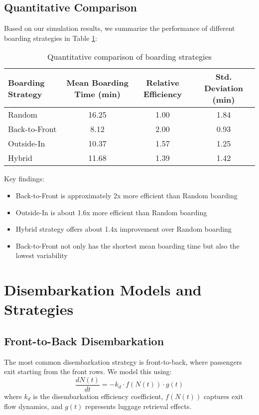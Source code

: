 \documentclass[12pt,a4paper]{article}
\begin{document}
\subsection{Quantitative Comparison}
Based on our simulation results, we summarize the performance of different boarding strategies in Table \ref{tab:boarding_comparison}:

\begin{table}[H]
\centering
\begin{tabular}{|l|c|c|c|}
\hline
\textbf{Boarding Strategy} & \textbf{Mean Boarding Time (min)} & \textbf{Relative Efficiency} & \textbf{Std. Deviation (min)} \\ \hline
Random & 16.25 & 1.00 & 1.84 \\ \hline
Back-to-Front & 8.12 & 2.00 & 0.93 \\ \hline
Outside-In & 10.37 & 1.57 & 1.25 \\ \hline
Hybrid & 11.68 & 1.39 & 1.42 \\ \hline
\end{tabular}
\caption{Quantitative comparison of boarding strategies}
\label{tab:boarding_comparison}
\end{table}

Key findings:
\begin{itemize}
    \item Back-to-Front is approximately 2x more efficient than Random boarding
    \item Outside-In is about 1.6x more efficient than Random boarding
    \item Hybrid strategy offers about 1.4x improvement over Random boarding
    \item Back-to-Front not only has the shortest mean boarding time but also the lowest variability
\end{itemize}

\section{Disembarkation Models and Strategies}

\subsection{Front-to-Back Disembarkation}
The most common disembarkation strategy is front-to-back, where passengers exit starting from the front rows. We model this using:
\begin{equation}
\frac{dN(t)}{dt} = -k_d \cdot f(N(t)) \cdot g(t)
\label{eq:disembarkation}
\end{equation}
where $k_d$ is the disembarkation efficiency coefficient, $f(N(t))$ captures exit flow dynamics, and $g(t)$ represents luggage retrieval effects.
\end{document}
